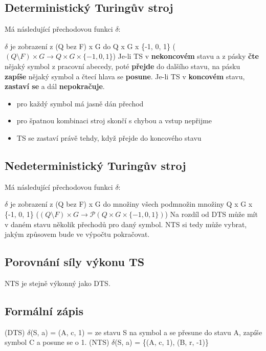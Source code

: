 \documentclass{szzclass}
\begin{document}
\subsection{Deterministický Turingův stroj}
Má následující přechodovou funkci $\delta$:

$\delta$ je zobrazení z (Q bez F) x G do Q x G x \{-1, 0, 1\} ($(Q \setminus F) \times G \rightarrow Q \times G \times \{-1, 0, 1\}$)
\newline
Je-li TS v \textbf{nekoncovém} stavu a z pásky \textbf{čte} nějaký symbol z pracovní abecedy, poté \textbf{přejde} do dalšího stavu, na pásku \textbf{zapíše} nějaký symbol
a čtecí hlava se \textbf{posune}.
\newline
Je-li TS v \textbf{koncovém} stavu, \textbf{zastaví se} a dál \textbf{nepokračuje}.
\newline
\begin{itemize}
\item pro každý symbol má jasně dán přechod
\item pro špatnou kombinaci stroj skončí s chybou a vstup nepřijme
\item TS se zastaví právě tehdy, když přejde do koncového stavu
\end{itemize}

\subsection{Nedeterministický Turingův stroj}
Má následující přechodovou funkci $\delta$:

$\delta$ je zobrazení z (Q bez F) x G do množiny všech podmnožin množiny Q x G x \{-1, 0, 1\} ($(Q \setminus F) \times G \rightarrow \mathcal{P}(Q \times G \times \{-1, 0, 1\})$)
\newline
\newline
Na rozdíl od DTS může mít v daném stavu několik přechodů pro daný symbol.
NTS si tedy může vybrat, jakým způsovem bude ve výpočtu pokračovat.

\subsection{Porovnání síly výkonu TS}
NTS je stejně výkonný jako DTS.
\subsection{Formální zápis}
(DTS) $\delta$(S, a) = (A, c, 1) = ze stavu S na symbol a se přesune do stavu A, zapíše symbol C a posune se o 1.
\newline
(NTS) $\delta$(S, a) = \{(A, c, 1), (B, r, -1)\}
\end{document}
